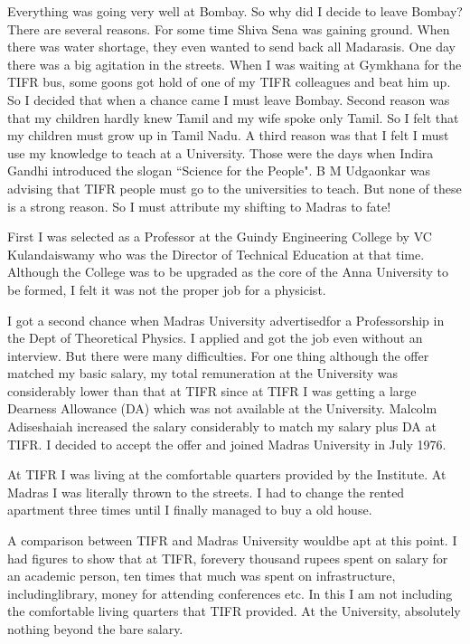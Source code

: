 Everything was going very well at Bombay. So why did I decide to leave 
Bombay? There are several reasons. For some time Shiva Sena was gaining 
ground. When there was water shortage, they even wanted to send back all 
Madarasis. One day there was a big agitation in the streets. When I was 
waiting at Gymkhana for the TIFR bus, some goons got hold of one of my 
TIFR colleagues and beat him up. So I decided that when a chance came I 
must leave Bombay. Second reason was that my children hardly knew Tamil 
and my wife spoke only Tamil. So I felt that my children must grow up in 
Tamil Nadu. A third reason was that I felt I must use my knowledge to 
teach at a University. Those were the days when Indira Gandhi introduced 
the slogan ``Science for the People". B M Udgaonkar was advising that 
TIFR people must go to the universities to teach. But none of these is a 
strong reason. So I must attribute my shifting to Madras to fate!

First I was selected as a Professor at the Guindy Engineering College by 
VC Kulandaiswamy who was the Director of Technical Education at that 
time. Although the College was to be upgraded as the core of the Anna 
University to be formed, I felt it was not the proper job for a 
physicist.

I got a second chance when Madras University advertised\break for a 
Professorship in the Dept of Theoretical Physics. I applied and got the 
job even without an interview. But there were many difficulties. For one 
thing although the offer matched my basic salary, my total remuneration 
at the University was considerably lower than that at TIFR since at TIFR 
I was getting a large Dearness Allowance (DA) which was not available at 
the University. Malcolm Adiseshaiah increased the salary considerably to 
match my salary plus DA at TIFR. I decided to accept the offer and 
joined Madras University in July 1976.

At TIFR I was living at the comfortable quarters provided by the 
Institute. At Madras I was literally thrown to the streets. I had to 
change the rented apartment three times until I finally managed to buy a 
old house.

A comparison between TIFR and Madras University would\break be apt at this 
point. I had figures to show that at TIFR, for\break every thousand rupees 
spent on salary for an academic person, ten times that much was spent on 
infrastructure, including\break library, money for attending conferences etc. 
In this I am not including the comfortable living quarters that TIFR 
provided. At the University, absolutely nothing beyond the bare salary.

